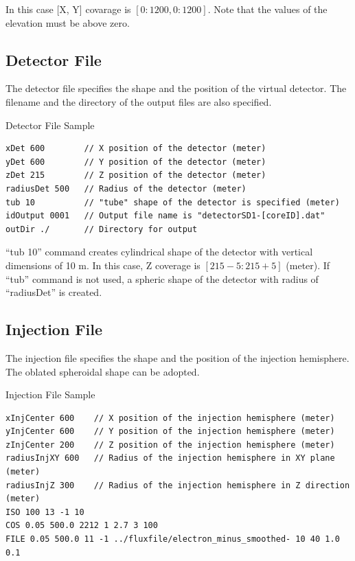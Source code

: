 \documentclass[11pt,a4paper]{jsarticle}
\begin{document}
In this case [X, Y] covarage is $[0 : 1200, 0 : 1200]$.
Note that the values of the elevation must be above zero.


\subsection{Detector File}
The detector file specifies the shape and the position of the virtual detector.
The filename and the directory of the output files are also specified.

\begin{itembox}[c]{Detector File Sample}
{\small
\begin{verbatim}
xDet 600        // X position of the detector (meter)
yDet 600        // Y position of the detector (meter)
zDet 215        // Z position of the detector (meter)
radiusDet 500   // Radius of the detector (meter)
tub 10          // "tube" shape of the detector is specified (meter)
idOutput 0001   // Output file name is "detectorSD1-[coreID].dat"
outDir ./       // Directory for output
\end{verbatim}}
\end{itembox}

``tub 10'' command creates cylindrical shape of the detector with vertical dimensions of 10 m. 
In this case, Z coverage is $[215 - 5 : 215 + 5]$ (meter). If ``tub'' command is not used, 
a spheric shape of the detector with radius of ``radiusDet'' is created.


\subsection{Injection File}
The injection file specifies the shape and the position of the injection
hemisphere. The oblated spheroidal shape can be adopted.

\begin{itembox}[c]{Injection File Sample}
{\small
\begin{verbatim}
xInjCenter 600    // X position of the injection hemisphere (meter)
yInjCenter 600    // Y position of the injection hemisphere (meter)
zInjCenter 200    // Z position of the injection hemisphere (meter)
radiusInjXY 600   // Radius of the injection hemisphere in XY plane (meter)
radiusInjZ 300    // Radius of the injection hemisphere in Z direction (meter)
ISO 100 13 -1 10
COS 0.05 500.0 2212 1 2.7 3 100
FILE 0.05 500.0 11 -1 ../fluxfile/electron_minus_smoothed- 10 40 1.0 0.1
\end{verbatim}}
\end{itembox}
\end{document}
